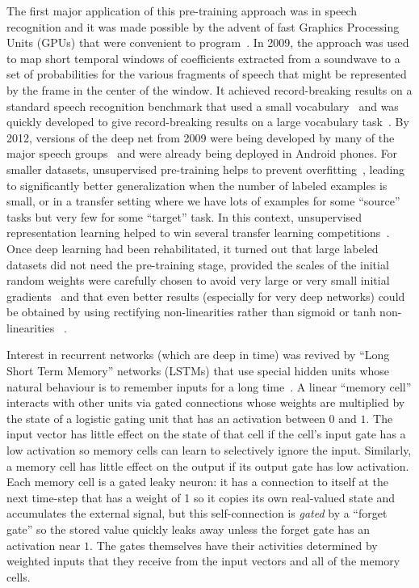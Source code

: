 \documentclass[10pts]{article}
\begin{document}
The first major application of this pre-training approach was in speech
recognition and it was made possible by the advent of fast Graphics
Processing Units (GPUs) that were convenient to
program~\citep{RainaICML09-small}.  In 2009, the approach was used to map
short temporal windows of coefficients extracted from a soundwave to a set
of probabilities for the various fragments of speech that might be
represented by the frame in the center of the window.  It achieved
record-breaking results on a standard speech recognition benchmark that
used a small vocabulary~\citep{TIMITpaper} and was quickly developed to
give record-breaking results on a large vocabulary task~\citep{Dahl2012}.
By 2012, versions of the deep net from 2009 were being developed by many of
the major speech groups~\citep{Hinton-et-al-2012} and were already being
deployed in Android phones.  For smaller datasets, unsupervised
pre-training helps to prevent overfitting~\citep{Erhan+al-2010-small},
leading to significantly better generalization when the number of labeled
examples is small, or in a transfer setting where we have lots of
examples for some ``source'' tasks but very few for some ``target''
task. In this context, unsupervised representation learning helped to win
several transfer learning
competitions~\citep{UTLC+LISA-2011-small,Goodfellow-icml2012}.  Once deep
learning had been rehabilitated, it turned out that large labeled datasets
did not need the pre-training stage, provided the scales of the initial
random weights were carefully chosen to avoid very large or very small
initial gradients~\citep{GlorotAISTATS2010-small} and that even better
results (especially for very deep networks)
could be obtained by using rectifying non-linearities rather than
sigmoid or tanh non-linearities
~\citep{Nair-2010-small,Glorot+al-AI-2011-small,Krizhevsky-2012-small,Dahl-et-al-ICASSP2013}.

Interest in recurrent networks (which are deep in time) was revived by
``Long Short Term Memory'' networks (LSTMs) that use special hidden units
whose natural behaviour is to remember inputs for a long
time~\citep{Hochreiter+Schmidhuber-1997}.  
A linear ``memory cell'' interacts with other units
via gated connections whose weights are multiplied by the state of a
logistic gating unit that has an activation between $0$ and $1$. The input
vector has little effect on the state of that cell if the cell's input
gate has a low activation so memory cells can learn to selectively ignore
the input.  Similarly, a memory cell has little effect on the output if its
output gate has low activation. Each memory cell is a gated leaky neuron: 
it has a connection to
itself at the next time-step that has a weight of 1 so it copies its
own real-valued state and accumulates the external signal, 
but this self-connection is {\em gated} by a ``forget gate'' so
the stored value quickly leaks away unless the forget gate has an activation
near $1$.  The gates themselves have their activities determined by
weighted inputs that they receive from the input vectors and all of the
memory cells.
\end{document}
